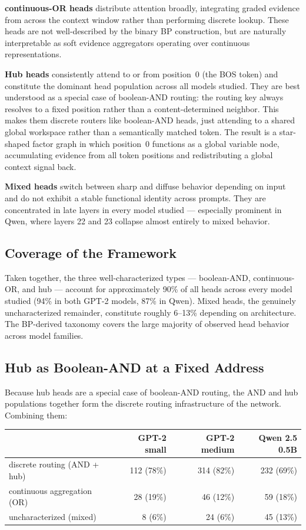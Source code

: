 \textbf{continuous-OR heads} distribute attention broadly, integrating graded evidence from across the context window rather than performing discrete lookup. These heads are not well-described by the binary BP construction, but are naturally interpretable as soft evidence aggregators operating over continuous representations.

\textbf{Hub heads} consistently attend to or from position~0 (the BOS token) and constitute the dominant head population across all models studied. They are best understood as a special case of boolean-AND routing: the routing key always resolves to a fixed position rather than a content-determined neighbor. This makes them discrete routers like boolean-AND heads, just attending to a shared global workspace rather than a semantically matched token. The result is a star-shaped factor graph in which position~0 functions as a global variable node, accumulating evidence from all token positions and redistributing a global context signal back.

\textbf{Mixed heads} switch between sharp and diffuse behavior depending on input and do not exhibit a stable functional identity across prompts. They are concentrated in late layers in every model studied --- especially prominent in Qwen, where layers 22 and 23 collapse almost entirely to mixed behavior.

\subsection*{Coverage of the Framework}

Taken together, the three well-characterized types --- boolean-AND, continuous-OR, and hub --- account for approximately 90\% of all heads across every model studied (94\% in both GPT-2 models, 87\% in Qwen). Mixed heads, the genuinely uncharacterized remainder, constitute roughly 6--13\% depending on architecture. The BP-derived taxonomy covers the large majority of observed head behavior across model families.

\subsection*{Hub as Boolean-AND at a Fixed Address}

Because hub heads are a special case of boolean-AND routing, the AND and hub populations together form the discrete routing infrastructure of the network. Combining them:

\begin{center}
\begin{tabular}{lrrr}
\toprule
 & GPT-2 small & GPT-2 medium & Qwen 2.5 0.5B \\
\midrule
discrete routing (AND + hub) & 112 (78\%) & 314 (82\%) & 232 (69\%) \\
continuous aggregation (OR) & 28 (19\%) & 46 (12\%) & 59 (18\%) \\
uncharacterized (mixed) & 8 (6\%) & 24 (6\%) & 45 (13\%) \\
\bottomrule
\end{tabular}
\end{center}

